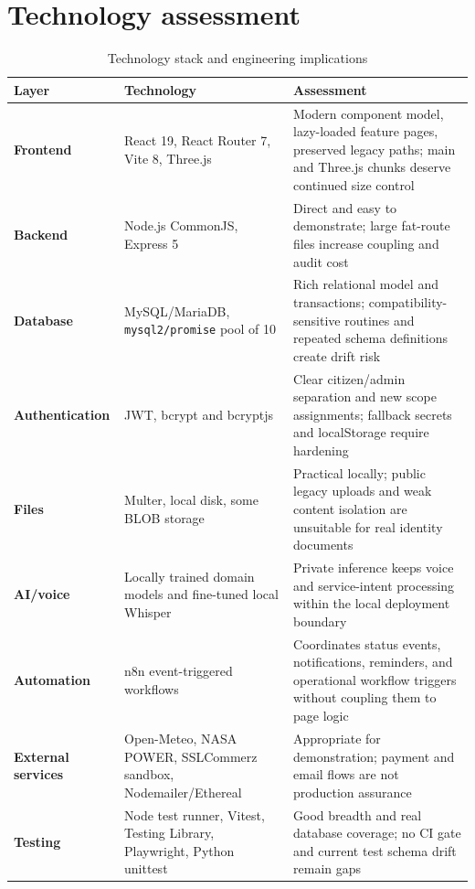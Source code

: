 \documentclass[12pt,a4paper,oneside]{report}
\newcommand{\code}[1]{\texttt{#1}}
\begin{document}
\section{Technology assessment}

\begin{table}[htbp]
\centering
\caption{Technology stack and engineering implications}
\begin{tabularx}{\textwidth}{>{\bfseries}p{} p{} X}
\toprule
Layer & Technology & Assessment\\
\midrule
Frontend & React 19, React Router 7, Vite 8, Three.js & Modern component model, lazy-loaded feature pages, preserved legacy paths; main and Three.js chunks deserve continued size control\\
Backend & Node.js CommonJS, Express 5 & Direct and easy to demonstrate; large fat-route files increase coupling and audit cost\\
Database & MySQL/MariaDB, \code{mysql2/promise} pool of 10 & Rich relational model and transactions; compatibility-sensitive routines and repeated schema definitions create drift risk\\
Authentication & JWT, bcrypt and bcryptjs & Clear citizen/admin separation and new scope assignments; fallback secrets and localStorage require hardening\\
Files & Multer, local disk, some BLOB storage & Practical locally; public legacy uploads and weak content isolation are unsuitable for real identity documents\\
AI/voice & Locally trained domain models and fine-tuned local Whisper & Private inference keeps voice and service-intent processing within the local deployment boundary\\
Automation & n8n event-triggered workflows & Coordinates status events, notifications, reminders, and operational workflow triggers without coupling them to page logic\\
External services & Open-Meteo, NASA POWER, SSLCommerz sandbox, Nodemailer/Ethereal & Appropriate for demonstration; payment and email flows are not production assurance\\
Testing & Node test runner, Vitest, Testing Library, Playwright, Python unittest & Good breadth and real database coverage; no CI gate and current test schema drift remain gaps\\
\bottomrule
\end{tabularx}
\end{table}
\end{document}
